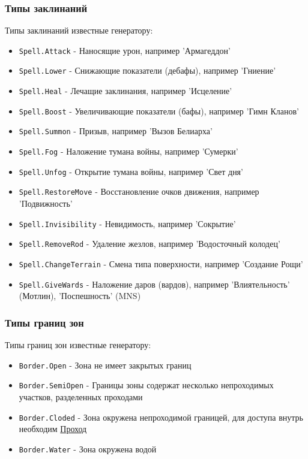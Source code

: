\subsubsection{Типы заклинаний}
\label{spellTypes}
Типы заклинаний известные генератору:
\begin{itemize}
\item \texttt{Spell.Attack} - Наносящие урон, например 'Армагеддон'
\item \texttt{Spell.Lower} - Снижающие показатели (дебафы), например 'Гниение'
\item \texttt{Spell.Heal} - Лечащие заклинания, например 'Исцеление'
\item \texttt{Spell.Boost} - Увеличивающие показатели (бафы), например 'Гимн Кланов'
\item \texttt{Spell.Summon} - Призыв, например 'Вызов Белиарха'
\item \texttt{Spell.Fog} - Наложение тумана войны, например 'Сумерки'
\item \texttt{Spell.Unfog} - Открытие тумана войны, например 'Свет дня'
\item \texttt{Spell.RestoreMove} - Восстановление очков движения, например 'Подвижность'
\item \texttt{Spell.Invisibility} - Невидимость, например 'Сокрытие'
\item \texttt{Spell.RemoveRod} - Удаление жезлов, например 'Водосточный колодец'
\item \texttt{Spell.ChangeTerrain} - Смена типа поверхности, например 'Создание Рощи'
\item \texttt{Spell.GiveWards} - Наложение даров (вардов), например 'Влиятельность' (Мотлин), 'Поспешность' (MNS)
\end{itemize}

\subsubsection{Типы границ зон}
\label{borderTypes}
Типы границ зон известные генератору:
\begin{itemize}
\item \texttt{Border.Open} - Зона не имеет закрытых границ
\item \texttt{Border.SemiOpen} - Границы зоны содержат несколько непроходимых участков, разделенных проходами
\item \texttt{Border.Cloded} - Зона окружена непроходимой границей, для доступа внутрь необходим \hyperref[connection]{Проход}
\item \texttt{Border.Water} - Зона окружена водой
\end{itemize}

